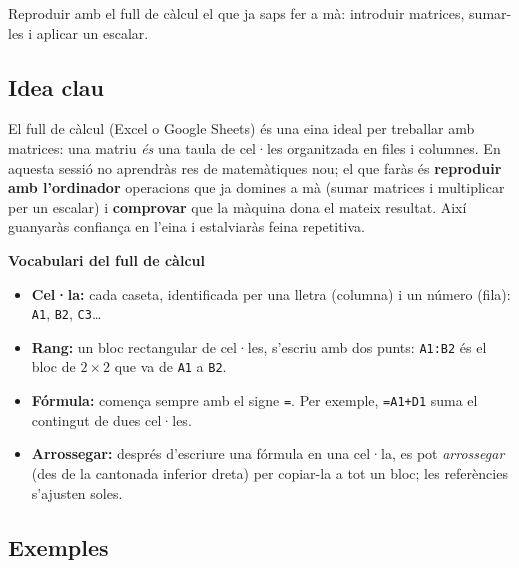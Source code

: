 %
{Reproduir amb el full de càlcul el que ja saps fer a mà: introduir matrices, sumar-les i aplicar un escalar.}

\subsection{Idea clau}

El full de càlcul (Excel o Google Sheets) és una eina ideal per treballar amb
matrices: una matriu \emph{és} una taula de cel·les organitzada en files i
columnes. En aquesta sessió no aprendràs res de matemàtiques nou; el que faràs és
\textbf{reproduir amb l'ordinador} operacions que ja domines a mà (sumar matrices
i multiplicar per un escalar) i \textbf{comprovar} que la màquina dona el mateix
resultat. Així guanyaràs confiança en l'eina i estalviaràs feina repetitiva.

\begin{idea}
\textbf{Vocabulari del full de càlcul}
\begin{itemize}[leftmargin=1.4em, itemsep=2pt]
  \item \textbf{Cel·la:} cada caseta, identificada per una lletra (columna) i un
        número (fila): \texttt{A1}, \texttt{B2}, \texttt{C3}\dots
  \item \textbf{Rang:} un bloc rectangular de cel·les, s'escriu amb dos punts:
        \texttt{A1:B2} és el bloc de $2\times 2$ que va de \texttt{A1} a \texttt{B2}.
  \item \textbf{Fórmula:} comença sempre amb el signe \texttt{=}. Per exemple,
        \texttt{=A1+D1} suma el contingut de dues cel·les.
  \item \textbf{Arrossegar:} després d'escriure una fórmula en una cel·la, es pot
        \emph{arrossegar} (des de la cantonada inferior dreta) per copiar-la a tot
        un bloc; les referències s'ajusten soles.
\end{itemize}
\end{idea}

\subsection{Exemples}

